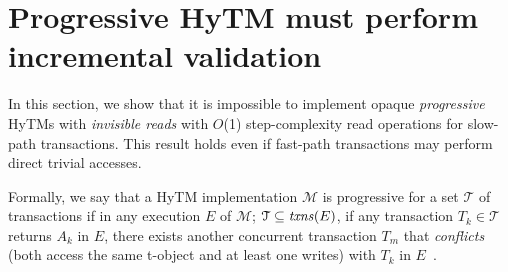 \section{Progressive HyTM must perform incremental validation}
\label{sec:lb}
%
In this section, we show that it is impossible to implement opaque \emph{progressive} HyTMs with \emph{invisible reads}
with $O$(1) step-complexity read operations for slow-path transactions. 
This result holds even if fast-path transactions may perform
direct trivial accesses.

Formally, we say that a HyTM implementation $\mathcal{M}$ is progressive
for a set $\mathcal{T}$ of transactions
if in any execution $E$ of $\mathcal{M}$; $\mathcal{T} \subseteq \ms{txns}(E)$, 
if any transaction $T_k \in \mathcal{T}$ returns $A_k$ in $E$, there exists 
another concurrent transaction $T_m$ that \emph{conflicts} (both access the same t-object and at least one writes) with $T_k$ in $E$~\cite{tm-book}.

